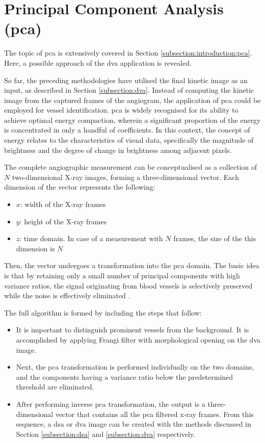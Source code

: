 \section{Principal Component Analysis (\gls{pca})}\label{section:pca}

The topic of \gls{pca} is extensively covered in Section \ref{subsection:introduction:pca}. Here, a possible approach of the \gls{dva} application is revealed.

So far, the preceding methodologies have utilised the final kinetic image as an input, as described in Section \ref{subsection:dva}. Instead of computing the kinetic image from the captured frames of the angiogram, the application of  \gls{pca} could be employed for vessel identification. \gls{pca} is widely recognised for its ability to achieve optimal energy compaction, wherein a significant proportion of the energy is concentrated in only a handful of coefficients. In this context, the concept of energy relates to the characteristics of visual data, specifically the magnitude of brightness and the degree of change in brightness among adjacent pixels. 

The complete angiographic measurement can be conceptualised as a collection of $N$ two-dimensional X-ray images, forming a three-dimensional vector. Each dimension of the vector represents the following:

\begin{itemize}
	\item $x$: width of the X-ray frames
	\item $y$: height of the X-ray frames
	\item $z$: time domain. In case of a measurement with $N$ frames, the size of the this dimension is $N$
\end{itemize}

Then, the vector undergoes a transformation into the \gls{pca} domain. The basic idea is that by retaining only a small number of principal components with high variance ratios, the signal originating from blood vessels is selectively preserved while the noise is effectively eliminated \cite{lee2016low}.

The full algorithm is formed by including the steps that follow:
\begin{itemize}
	\item It is important to distinguish prominent vessels from the background. It is accomplished by applying Frangi filter \cite{frangi1998multiscale} with morphological opening \cite{gonzalez2018digital} on the \gls{dva} image.
	\item Next, the \gls{pca} transformation is performed individually on the two domains, and the components having a variance ratio below the predetermined threshold are eliminated.
	\item After performing inverse \gls{pca} transformation, the output is a three-dimensional vector that contains all the \gls{pca} filtered x-ray frames. From this sequence, a \gls{dsa} or \gls{dva} image can be created with the methods discussed in Section \ref{subsection:dsa} and \ref{subsection:dva} respectively.
\end{itemize}

